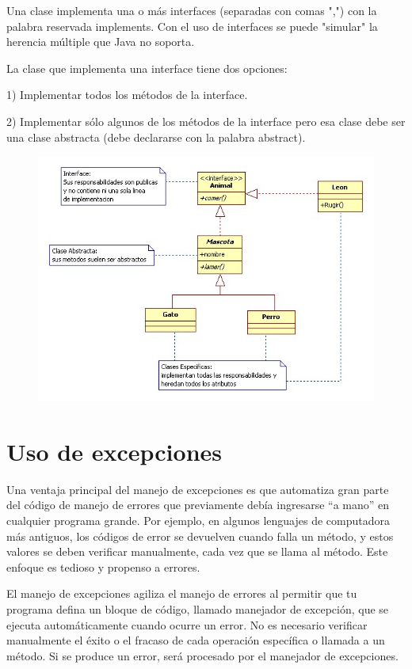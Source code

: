 \documentclass[12pt,a4paper]{report}
\begin{document}
{Una clase implementa una o más interfaces (separadas con comas ",") con la palabra reservada implements. Con el uso de interfaces se puede "simular" la herencia múltiple que Java no soporta. 

La clase que implementa una interface tiene dos opciones: 

1) Implementar todos los métodos de la interface. 

2) Implementar sólo algunos de los métodos de la interface pero esa clase debe ser una clase abstracta (debe declararse con la palabra abstract).

\begin{figure}[hbtp]
\centering
\includegraphics[scale=0.5]{Clases-Abstractas-e-Interfaces.jpg}
\end{figure}
\section*{Uso de excepciones }
Una ventaja principal del manejo de excepciones es que automatiza gran parte del código de manejo de errores que previamente debía ingresarse “a mano” en cualquier programa grande. Por ejemplo, en algunos lenguajes de computadora más antiguos, los códigos de error se devuelven cuando falla un método, y estos valores se deben verificar manualmente, cada vez que se llama al método. Este enfoque es tedioso y propenso a errores.

El manejo de excepciones agiliza el manejo de errores al permitir que tu programa defina un bloque de código, llamado manejador de excepción, que se ejecuta automáticamente cuando ocurre un error. No es necesario verificar manualmente el éxito o el fracaso de cada operación específica o llamada a un método. Si se produce un error, será procesado por el manejador de excepciones.

}
\end{document}
